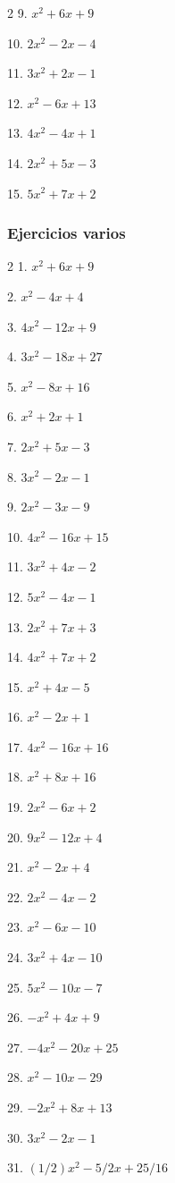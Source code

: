 \documentclass[12pt]{article}
\begin{document}
{\begin{multicols}{2}
9. $x^2 + 6x + 9$

10. $2x^2 - 2x - 4$

11. $3x^2 + 2x - 1$

12. $x^2 - 6x + 13$

13. $4x^2 - 4x + 1$

14. $2x^2 + 5x - 3$

15. $5x^2 + 7x + 2$
\end{multicols}

\subsubsection{Ejercicios varios}\label{ejercicios-varios}
\begin{multicols}{2}
1. $x^2 + 6x + 9$

2. $x^2 - 4x + 4$

3. $4x^2 - 12x + 9$

4. $3x^2 - 18x + 27$

5. $x^2 - 8x + 16$

6. $x^2 + 2x + 1$

7. $2x^2 + 5x - 3$

8. $3x^2 - 2x - 1$

9. $2x^2 - 3x - 9$

10. $4x^2 - 16x + 15$

11. $3x^2 + 4x - 2$

12. $5x^2 - 4x - 1$

13. $2x^2 + 7x + 3$

14. $4x^2 + 7x + 2$

15. $x^2 + 4x - 5$

16. $x^2 - 2x + 1$

17. $4x^2 - 16x + 16$

18. $x^2 + 8x + 16$

19. $2x^2 - 6x + 2$

20. $9x^2 - 12x + 4$

21. $x^2 - 2x + 4$

22. $2x^2 - 4x - 2$

23. $x^2 - 6x - 10$

24. $3x^2 + 4x - 10$

25. $5x^2 - 10x - 7$

26. $-x^2 + 4x + 9$

27. $-4x^2 - 20x + 25$

28. $x^2 - 10x - 29$

29. $-2x^2 + 8x + 13$

30. $3x^2 - 2x - 1$

31. $(1/2)x^2 - 5/2x + 25/16$


\end{multicols}}
\end{document}
